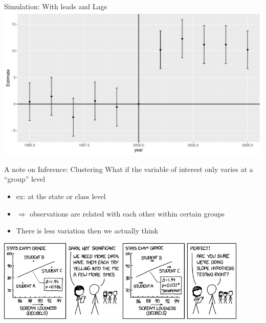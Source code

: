 \documentclass[
  ignorenonframetext,
]{beamer}
\begin{document}
\begin{frame}{Simulation: With leads and Lags}
\protect\hypertarget{simulation-with-leads-and-lags-7}{}
\includegraphics{"Slides_DID_files/figure-beamer/didplotb-1.pdf"}
\end{frame}

\begin{frame}{A note on Inference: Clustering}
\protect\hypertarget{a-note-on-inference-clustering}{}
What if the variable of interest only varies at a ``group'' level

\begin{itemize}
\item
  ex: at the state or class level
\item
  \(\Rightarrow\) observations are related with each other within
  certain groups
\item
  There is less variation then we actually think
\end{itemize}

\includegraphics[width=0.9\textwidth,height=\textheight]{"images/cluster_comic.png"}
\end{frame}
\end{document}
